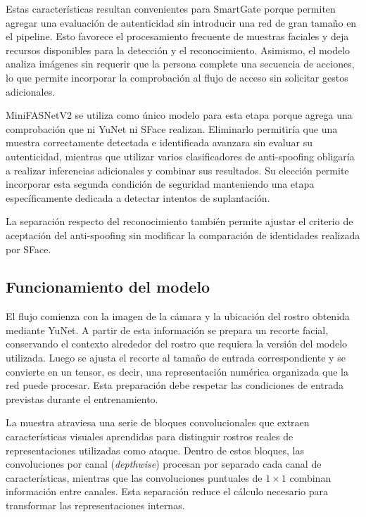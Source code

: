 Estas características resultan convenientes para SmartGate porque permiten agregar una evaluación de autenticidad sin introducir una red de gran tamaño en el pipeline. Esto favorece el procesamiento frecuente de muestras faciales y deja recursos disponibles para la detección y el reconocimiento. Asimismo, el modelo analiza imágenes sin requerir que la persona complete una secuencia de acciones, lo que permite incorporar la comprobación al flujo de acceso sin solicitar gestos adicionales.

MiniFASNetV2 se utiliza como único modelo para esta etapa porque agrega una comprobación que ni YuNet ni SFace realizan. Eliminarlo permitiría que una muestra correctamente detectada e identificada avanzara sin evaluar su autenticidad, mientras que utilizar varios clasificadores de anti-spoofing obligaría a realizar inferencias adicionales y combinar sus resultados. Su elección permite incorporar esta segunda condición de seguridad manteniendo una etapa específicamente dedicada a detectar intentos de suplantación.

La separación respecto del reconocimiento también permite ajustar el criterio de aceptación del anti-spoofing sin modificar la comparación de identidades realizada por SFace.

\subsection{Funcionamiento del modelo}

El flujo comienza con la imagen de la cámara y la ubicación del rostro obtenida mediante YuNet. A partir de esta información se prepara un recorte facial, conservando el contexto alrededor del rostro que requiera la versión del modelo utilizada. Luego se ajusta el recorte al tamaño de entrada correspondiente y se convierte en un tensor, es decir, una representación numérica organizada que la red puede procesar. Esta preparación debe respetar las condiciones de entrada previstas durante el entrenamiento.

La muestra atraviesa una serie de bloques convolucionales que extraen características visuales aprendidas para distinguir rostros reales de representaciones utilizadas como ataque. Dentro de estos bloques, las convoluciones por canal (\textit{depthwise}) procesan por separado cada canal de características, mientras que las convoluciones puntuales de $1 \times 1$ combinan información entre canales. Esta separación reduce el cálculo necesario para transformar las representaciones internas.

